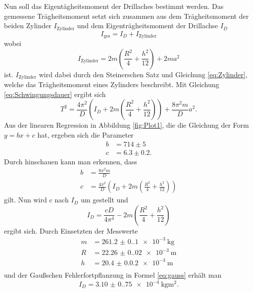 \noindent Nun soll das Eigentägheitsmoment der Drillaches bestimmt werden.
Das gemessene Trägheitsmoment setzt sich zusammen aus dem Trägheitsmoment der beiden Zylinder $I_\text{Zylinder}$
  und dem Eigenträgheitsmoment der Drillachse $I_D$
  \begin{equation*}
    I_{\text{ges}} = I_D + I_{\text{Zylinder}}
   \end{equation*}
wobei
    \begin{equation*}
    I_{\text{Zylinder}} = 2m(\frac{R^2}{4}+\frac{h^2}{12})+2ma^2
  \end{equation*}
  ist.
  $I_{\text{Zylinder}}$ wird dabei durch den Steinerschen Satz und Gleichung \ref{eq:Zylinder},
welche das Trägheitsmoment eines Zylinders beschreibt.
Mit Gleichung \eqref{eq:Schwingungsdauer} ergibt sich
  \begin{equation*}
    T^2 = \frac{4 \pi^2}{D}(I_D + 2m(\frac{R^2}{4}+\frac{h^2}{12}))+\frac{8 \pi^2 m}{D}a^2.
    \label{equ:T^2}
  \end{equation*}
Aus der linearen Regression in Abbildung \ref{fig:Plot1}, die die Gleichung der Form $y = b x + c$ hat, ergeben sich die Parameter
  \begin{align*}
    b &= 714 \pm 5 \\
    c &= 6.3 \pm 0.2.
  \end{align*}
Durch hinschauen kann man erkennen, dass
  \begin{align*}
    b &= \frac{8 \pi^2 m}{D} \\
    c &= \frac{4 \pi^2}{D}(I_D + 2m(\frac{R^2}{4}+\frac{h^2}{12}))
  \end{align*}
  gilt.
  Nun wird c nach $I_D$ um gestellt und
  \begin{equation*}
    I_D = \frac{cD}{4\pi^4}- 2m(\frac{R^2}{4}+\frac{h^2}{12})
  \end{equation*}
  ergibt sich.
  Durch Einsetzten der Messwerte
  \begin{align*}
    m &= \SI{261.2(0.1)e-3}{\kilogram} \\
    R &= \SI{22.26(0.02)e-3}{\meter}\\
    h &= \SI{20.4(0.02)e-3}{\meter}\\
  \end{align*}
  und der Gaußschen Fehlerfortpflanzung in Formel \eqref{eq:gauss} erhält man
  \begin{equation*}
    I_D = \SI{3.10(0.75)e-4}{\kilogram \meter\squared}.
  \end{equation*}

